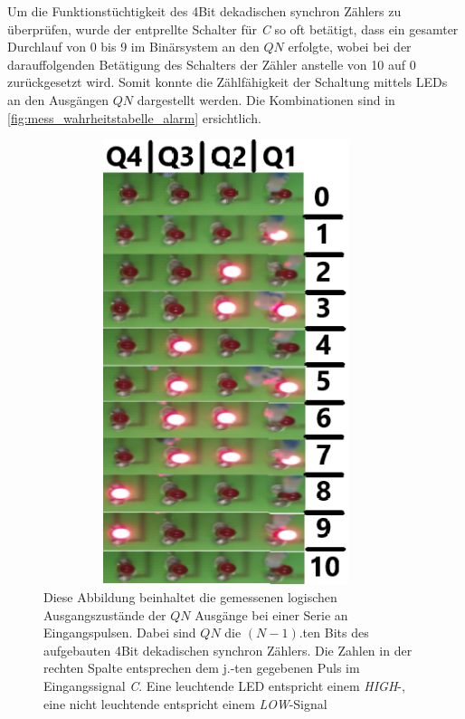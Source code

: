 \documentclass[12pt,english,ngerman]{scrartcl}
\begin{document}
Um die Funktionstüchtigkeit des 4Bit dekadischen synchron Zählers zu
überprüfen, wurde der entprellte Schalter für \textit{C} so oft betätigt, dass ein
gesamter Durchlauf von 0 bis 9 im Binärsystem an den $QN$ erfolgte, 
wobei bei der darauffolgenden Betätigung
des Schalters der Zähler anstelle von 10 auf 0 zurückgesetzt wird. 
Somit konnte die Zählfähigkeit der Schaltung
mittels LEDs an den Ausgängen $QN$ dargestellt werden. Die Kombinationen sind
in \autoref{fig:mess_wahrheitstabelle_alarm} ersichtlich.

\begin{figure}[H]
  \centering
    \includegraphics[width=0.95\textwidth,height=13cm]{./figures/messungen/4bit/wahrheit.png}
  \caption{Diese Abbildung beinhaltet die gemessenen logischen Ausgangszustände
    der $QN$ Ausgänge bei einer Serie an Eingangspulsen. Dabei sind $QN$ die
    $(N-1)$.ten Bits des aufgebauten 4Bit dekadischen synchron Zählers. Die Zahlen
    in der rechten Spalte entsprechen dem j.-ten gegebenen Puls im
  Eingangssignal \textit{C}. Eine leuchtende LED entspricht einem
\textit{HIGH}-, eine nicht leuchtende entspricht einem \textit{LOW}-Signal}
  \label{fig:mess_wahrheitstabelle_alarm}
\end{figure}
\end{document}
